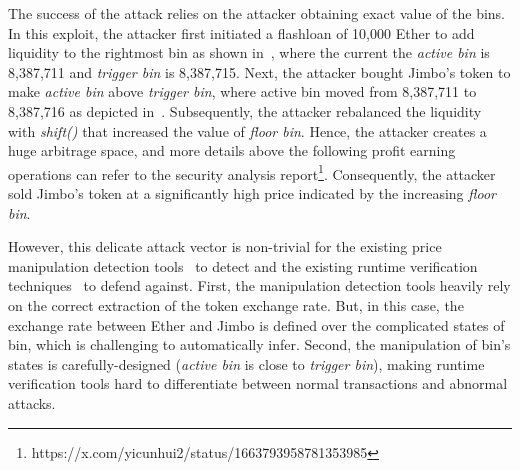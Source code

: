 The success of the attack relies on the attacker obtaining exact value of the bins.
In this exploit, the attacker first initiated a flashloan of 10,000 Ether to add liquidity to the rightmost bin as shown in~, where the current the \textit{active bin} is 8,387,711 and \textit{trigger bin} is 8,387,715.
Next, the attacker bought Jimbo's token to make \textit{active bin} above \textit{trigger bin}, where active bin moved from 8,387,711 to 8,387,716 as depicted in~.
Subsequently, the attacker rebalanced the liquidity with \textit{shift()} that increased the value of \textit{floor bin}.
Hence, the attacker creates a huge arbitrage space, and more details above the following profit earning operations can refer to the security analysis report\footnote{https://x.com/yicunhui2/status/1663793958781353985}.
Consequently, the attacker sold Jimbo's token at a significantly high price indicated by the increasing \textit{floor bin}.

However, this delicate attack vector is non-trivial for the existing price manipulation detection tools~\cite{xie2024defort,kong2023defitainter, wu2023defiranger} to detect and the existing runtime verification techniques~\cite{rodler2018sereum,chen2024demystifying} to defend against. 
First, the manipulation detection tools heavily rely on the correct extraction of the token exchange rate. But, in this case, the exchange rate between Ether and Jimbo is defined over the complicated states of bin, which is challenging to automatically infer.
Second, the manipulation of bin's states is carefully-designed (\textit{active bin} is close to \textit{trigger bin}), making runtime verification tools hard to differentiate between normal transactions and abnormal attacks.

